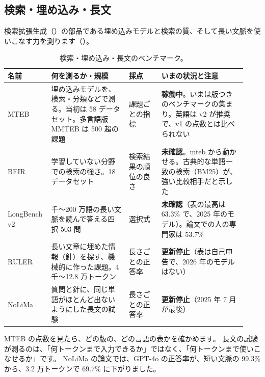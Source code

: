 \subsection{検索・埋め込み・長文}\label{sec:bm-retrieval}

検索拡張生成（）の部品である埋め込みモデルと検索の質、そして長い文脈を使いこなす力を測ります（）。

\begin{table}[htbp]
\centering\small\setlength{\tabcolsep}{4pt}
\caption{検索・埋め込み・長文のベンチマーク。}
\label{tab:bm-retrieval}
\begin{tabular}{@{}>{\raggedright\arraybackslash}p{0.15\linewidth}>{\raggedright\arraybackslash}p{0.31\linewidth}>{\raggedright\arraybackslash}p{0.13\linewidth}>{\raggedright\arraybackslash}p{0.34\linewidth}@{}}
\toprule
名前 & 何を測るか・規模 & 採点 & いまの状況と注意 \\
\midrule
MTEB \cite{muennighoff2022mteb} & 埋め込みモデルを、検索・分類などで測る。当初は 58 データセット。多言語版 MMTEB \cite{enevoldsen2025mmteb} は 500 超の課題 & 課題ごとの指標 & \textbf{稼働中}。いまは版つきのベンチマークの集まり。英語は v2 が推奨で、v1 の点数とは比べられない \\
\addlinespace[0.2em]
BEIR \cite{thakur2021beir} & 学習していない分野での検索の強さ。18 データセット & 検索結果の順位の良さ & \textbf{未確認}。mteb から動かせる。古典的な単語一致の検索（BM25）が、強い比較相手だと示した \\
\addlinespace[0.2em]
LongBench v2 \cite{bai2024longbenchv2} & 8 千〜200 万語の長い文脈を読んで答える四択 503 問 & 選択式 & \textbf{未確認}（表の最高は 63.3\% で、2025 年のモデル）。論文での人の専門家は 53.7\% \\
\addlinespace[0.2em]
RULER \cite{hsieh2024ruler} & 長い文章に埋めた情報（針）を探す、機械的に作った課題。4 千〜12.8 万トークン & 長さごとの正答率 & \textbf{更新停止}（表は自己申告で、2026 年のモデルはない） \\
\addlinespace[0.2em]
NoLiMa \cite{modarressi2025nolima} & 質問と針に、同じ単語がほとんど出ないようにした長文の試験 & 長さごとの正答率 & \textbf{更新停止}（2025 年 7 月が最後） \\
\bottomrule
\end{tabular}
\end{table}

MTEB の点数を見たら、どの版の、どの言語の表かを確かめます。
長文の試験が測るのは、「何トークンまで入力できるか」ではなく、「何トークンまで使いこなせるか」です。
NoLiMa の論文では、GPT-4o の正答率が、短い文脈の 99.3\% から、3.2 万トークンで 69.7\% に下がりました。

